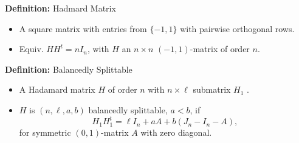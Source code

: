\documentclass{beamer}
\begin{document}
\begin{frame}

  \begin{block}{{\bf Definition:} Hadmard Matrix}
    \begin{itemize}
    \item A square matrix with entries from $\{-1,1\}$ with pairwise
      orthogonal rows.
    \item Equiv. $HH^t = nI_n$, with $H$ an $n \times n$ $(-1,1)$-matrix of
      order $n$.
    \end{itemize}
  \end{block}

  \pause

  \begin{block}{{\bf Definition:} Balancedly Splittable \cite[][]{splittable-hadamard}}
    \begin{itemize}
    \item A Hadamard matrix $H$ of order $n$ with $n \times \ell$ submatrix $H_1$ .
      \item $H$ is $(n,\ell,a,b)$ balancedly splittable, $a<b$, if $$H_1H_1^t =
        \ell I_n + aA + b(J_n-I_n-A),$$ for symmetric $(0,1)$-matrix $A$ with
        zero diagonal.
    \end{itemize}
  \end{block}

\end{frame}
\end{document}
